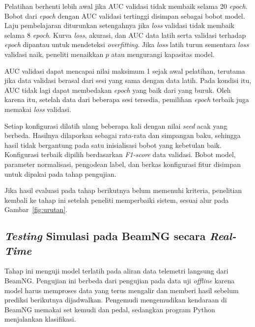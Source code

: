 Pelatihan berhenti lebih awal jika AUC validasi tidak membaik selama 20 \textit{epoch}. Bobot dari \textit{epoch} dengan AUC validasi tertinggi disimpan sebagai bobot model. Laju pembelajaran diturunkan setengahnya jika \textit{loss} validasi tidak membaik selama 8 \textit{epoch}. Kurva \textit{loss}, akurasi, dan AUC data latih serta validasi terhadap \textit{epoch} dipantau untuk mendeteksi \textit{overfitting}. Jika \textit{loss} latih turun sementara \textit{loss} validasi naik, peneliti menaikkan $p$ atau mengurangi kapasitas model.

AUC validasi dapat mencapai nilai maksimum 1 sejak awal pelatihan, terutama jika data validasi berasal dari sesi yang sama dengan data latih. Pada kondisi itu, AUC tidak lagi dapat membedakan \textit{epoch} yang baik dari yang buruk. Oleh karena itu, setelah data dari beberapa sesi tersedia, pemilihan \textit{epoch} terbaik juga memakai \textit{loss} validasi.

Setiap konfigurasi dilatih ulang beberapa kali dengan nilai \textit{seed} acak yang berbeda. Hasilnya dilaporkan sebagai rata-rata dan simpangan baku, sehingga hasil tidak bergantung pada satu inisialisasi bobot yang kebetulan baik. Konfigurasi terbaik dipilih berdasarkan \textit{F1-score} data validasi. Bobot model, parameter normalisasi, pengodean label, dan berkas konfigurasi fitur disimpan untuk dipakai pada tahap pengujian.

Jika hasil evaluasi pada tahap berikutnya belum memenuhi kriteria, penelitian kembali ke tahap ini setelah peneliti memperbaiki sistem, sesuai alur pada Gambar~\ref{fig:urutan}.

\subsection{\textit{Testing} Simulasi pada BeamNG secara \textit{Real-Time}}
\label{subsec:uji-beamng}
Tahap ini menguji model terlatih pada aliran data telemetri langsung dari BeamNG. Pengujian ini berbeda dari pengujian pada data uji \textit{offline} karena model harus memproses data yang terus mengalir dan memberi hasil sebelum prediksi berikutnya dijadwalkan. Pengemudi mengemudikan kendaraan di BeamNG memakai set kemudi dan pedal, sedangkan program Python menjalankan klasifikasi.

